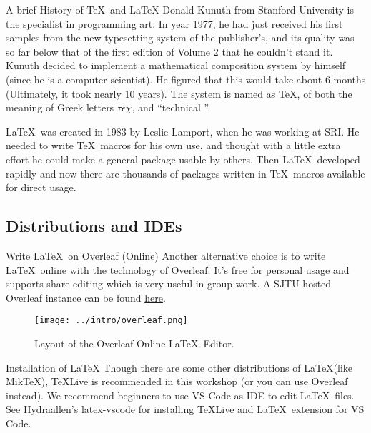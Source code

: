 \begin{frame}{A brief History of \TeX\ and \LaTeX}
    Donald Kunuth from Stanford University is the specialist in programming art. In year 1977, he had just received his first samples from the new typesetting system of the publisher's, and its quality was so far below that of the first edition of Volume 2 that he couldn't stand it. Kunuth decided to implement a mathematical composition system by himself (since he is a computer scientist). He figured that this would take about 6 months (Ultimately, it took nearly 10 years). The system is named as \TeX, of both the meaning of Greek letters $\tau\epsilon\chi$, and ``technical ''. \medskip

    \LaTeX\ was created in 1983 by Leslie Lamport, when he was working at SRI. He needed to write \TeX\ macros for his own use, and thought with a little extra effort he could make a general package usable by others. Then \LaTeX\  developed rapidly and now there are thousands of packages written in \TeX\ macros available for direct usage.

\end{frame}

\subsection{Distributions and IDEs}

\begin{frame}{Write \LaTeX\ on Overleaf (Online)}
    Another alternative choice is to write \LaTeX\ online with the technology of \href{https://www.overleaf.com/}{Overleaf}.
    It's free for personal usage and supports share editing which is very useful in group work.
    A SJTU hosted Overleaf instance can be found \href{https://latex.sjtu.edu.cn/}{here}.
    \begin{figure}
        \centering
        \texttt{[image: ../intro/overleaf.png]}
        \caption{Layout of the Overleaf Online \LaTeX\ Editor.}
    \end{figure}
\end{frame}


\begin{frame}{Installation of \LaTeX}
    Though there are some other distributions of \LaTeX (like Mik\TeX), \TeX Live is recommended in this workshop (or you can use Overleaf instead).
    We recommend beginners to use VS Code as IDE to edit \LaTeX\  files.
    See Hydraallen's \href{https://github.com/Hydraallen/Latex-vscode}{latex-vscode} for installing \TeX Live and \LaTeX\  extension for VS Code.
\end{frame}


